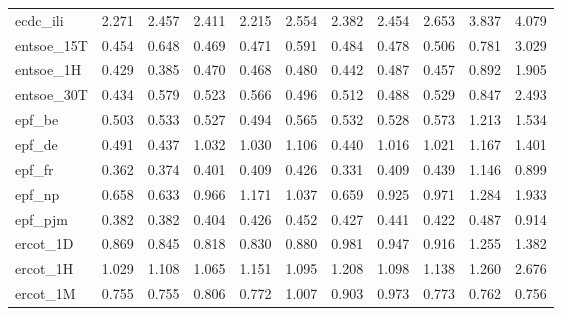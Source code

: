 {\begin{longtable}{@{}p{2.2cm}@{\hspace{6pt}}rrrrrrrrrr@{}}
\ttfamily\scriptsize ecdc\_ili & \cellcolor{medalSilver}2.271 & 2.457 & 2.411 & \cellcolor{medalGold}2.215 & 2.554 & \cellcolor{medalBronze}2.382 & 2.454 & 2.653 & 3.837 & 4.079 \\
\ttfamily\scriptsize entsoe\_15T & \cellcolor{medalGold}0.454 & 0.648 & \cellcolor{medalSilver}0.469 & \cellcolor{medalBronze}0.471 & 0.591 & 0.484 & 0.478 & 0.506 & 0.781 & 3.029 \\
\ttfamily\scriptsize entsoe\_1H & \cellcolor{medalSilver}0.429 & \cellcolor{medalGold}0.385 & 0.470 & 0.468 & 0.480 & \cellcolor{medalBronze}0.442 & 0.487 & 0.457 & 0.892 & 1.905 \\
\ttfamily\scriptsize entsoe\_30T & \cellcolor{medalGold}0.434 & 0.579 & 0.523 & 0.566 & \cellcolor{medalBronze}0.496 & 0.512 & \cellcolor{medalSilver}0.488 & 0.529 & 0.847 & 2.493 \\
\ttfamily\scriptsize epf\_be & \cellcolor{medalSilver}0.503 & 0.533 & \cellcolor{medalBronze}0.527 & \cellcolor{medalGold}0.494 & 0.565 & 0.532 & 0.528 & 0.573 & 1.213 & 1.534 \\
\ttfamily\scriptsize epf\_de & \cellcolor{medalBronze}0.491 & \cellcolor{medalGold}0.437 & 1.032 & 1.030 & 1.106 & \cellcolor{medalSilver}0.440 & 1.016 & 1.021 & 1.167 & 1.401 \\
\ttfamily\scriptsize epf\_fr & \cellcolor{medalSilver}0.362 & \cellcolor{medalBronze}0.374 & 0.401 & 0.409 & 0.426 & \cellcolor{medalGold}0.331 & 0.409 & 0.439 & 1.146 & 0.899 \\
\ttfamily\scriptsize epf\_np & \cellcolor{medalSilver}0.658 & \cellcolor{medalGold}0.633 & 0.966 & 1.171 & 1.037 & \cellcolor{medalBronze}0.659 & 0.925 & 0.971 & 1.284 & 1.933 \\
\ttfamily\scriptsize epf\_pjm & \cellcolor{medalGold}0.382 & \cellcolor{medalSilver}0.382 & \cellcolor{medalBronze}0.404 & 0.426 & 0.452 & 0.427 & 0.441 & 0.422 & 0.487 & 0.914 \\
\ttfamily\scriptsize ercot\_1D & 0.869 & \cellcolor{medalBronze}0.845 & \cellcolor{medalGold}0.818 & \cellcolor{medalSilver}0.830 & 0.880 & 0.981 & 0.947 & 0.916 & 1.255 & 1.382 \\
\ttfamily\scriptsize ercot\_1H & \cellcolor{medalGold}1.029 & 1.108 & \cellcolor{medalSilver}1.065 & 1.151 & \cellcolor{medalBronze}1.095 & 1.208 & 1.098 & 1.138 & 1.260 & 2.676 \\
\ttfamily\scriptsize ercot\_1M & \cellcolor{medalGold}0.755 & \cellcolor{medalSilver}0.755 & 0.806 & 0.772 & 1.007 & 0.903 & 0.973 & 0.773 & 0.762 & \cellcolor{medalBronze}0.756 \\

\end{longtable}}
